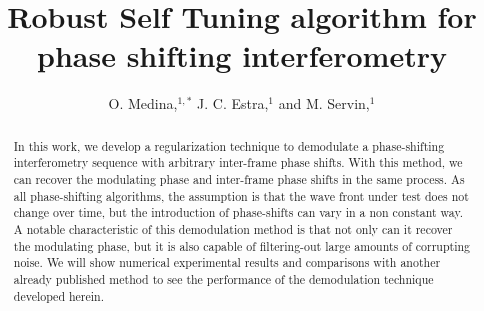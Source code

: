 \documentclass[letterpaper,12pt]{article}   %
\begin{document}
\title{Robust Self Tuning algorithm for phase shifting interferometry }
\author{O. Medina,$^{1,*}$ J. C. Estra,$^{1}$ and M. Servin,$^{1}$}
\address{$^1$Centro de Investigaciones en \'{O}ptica A. C., Loma del bosque 115, Col. Lomas del Campestre, Le\'{o}n Guanajuato,
37150, M\'{e}xico}
\address{$^*$Corresponding author: orlandomedina@cio.mx}

\maketitle

\begin{abstract}
In this work, we develop a regularization technique to demodulate a phase-shifting interferometry sequence with arbitrary inter-frame phase shifts. With this method, we can recover the modulating phase and inter-frame phase shifts in the same process. As all phase-shifting algorithms, the assumption is that the wave front under test does not change over time, but the introduction of phase-shifts can vary in a non constant way. A notable characteristic of this demodulation method is that not only can it recover the modulating phase, but it is also capable of filtering-out large amounts of corrupting noise. We will show numerical experimental results and comparisons with another already published method to see the performance of the demodulation technique developed herein.
\end{abstract}
\end{document}
